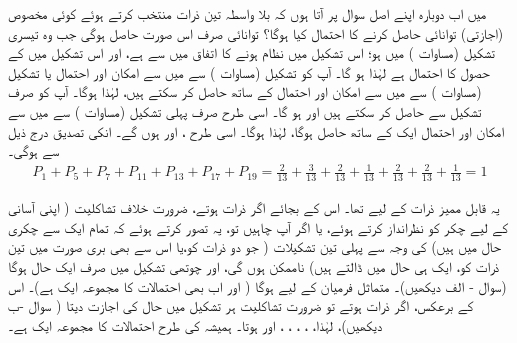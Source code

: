 میں اب دوبارہ اپنے اصل سوال پر آتا ہوں کہ بلا واسطہ تین ذرات منتخب کرتے ہوئے کوئی مخصوص (اجازتی) توانائی  حاصل کرنے کا احتمال  کیا ہوگا؟ توانائی  صرف اس صورت حاصل ہوگی جب وہ تیسری تشکیل (مساوات ) میں ہو؛ اس تشکیل میں نظام ہونے کا اتفاق  میں سے  ہے، اور اس تشکیل میں  کے حصول کا احتمال  ہے لہٰذا ہو گا۔ آپ  کو تشکیل  (مساوات  ) سے  میں سے  امکان اور احتمال  یا تشکیل  (مساوات ) سے  میں سے  امکان اور احتمال  کے ساتھ حاصل کر سکتے ہیں، 
 لہٰذا ہوگا۔ آپ  کو صرف تشکیل  سے حاصل کر سکتے ہیں اور  ہو گا۔ اسی طرح  صرف پہلی تشکیل (مساوات ) سے  میں سے  امکان اور احتمال ایک  کے ساتھ حاصل ہوگا، 
 لہٰذا ہوگا۔ اسی طرح ،
  اور
  ہوں گے۔ انکی تصدیق درج ذیل سے ہوگی۔
\begin{align*}
	P_1 + P_5 + P_7 + P_{11} + P_{13} + P_{17} + P_{19} = \frac{2}{13} + \frac{3}{13} + \frac{2}{13} + \frac{1}{13} + \frac{2}{13} + \frac{2}{13} + \frac{1}{13} = 1
\end{align*} 

یہ قابل ممیز ذرات کے لیے تھا۔ اس کے بجائے اگر ذرات  ہوتے، ضرورت خلاف تشاکلیت ( اپنی آسانی کے لیے چکر کو نظرانداز کرتے ہوئے، یا اگر آپ چاہیں تو، یہ تصور کرتے ہوئے کہ تمام ایک سے چکری حال میں ہیں) کی وجہ سے پہلی تین تشکیلات ( جو دو ذرات کو،یا اس سے بھی بری صورت میں تین ذرات کو، ایک ہی حال میں ڈالتے ہیں) ناممکن ہوں گی، اور چوتھی تشکیل میں صرف ایک حال ہوگا (سوال - الف دیکھیں)۔ متماثل فرمیان کے لیے  ہوگا ( اور اب بھی احتمالات کا مجموعہ ایک  ہے)۔ اس کے برعکس، اگر ذرات  ہوتے تو ضرورت تشاکلیت ہر تشکیل میں  حال کی اجازت دیتا ( سوال -ب دیکھیں)، لہٰذا،
 ،
 ، 
 ،
 ،
  اور
  ہوتا۔ ہمیشہ کی طرح احتمالات کا مجموعہ ایک  ہے۔

